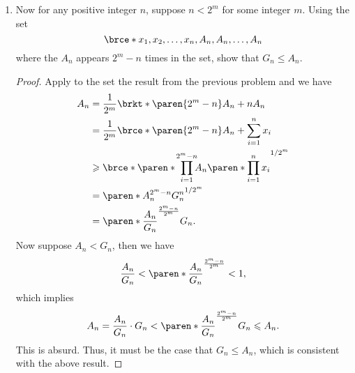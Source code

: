\documentclass[a4paper]{article}
\begin{document}
\begin{enumerate}
\begin{enumerate}
  \item Now for any positive integer \(n\), suppose \(n < 2^m\) for some
    integer \(m\).  Using the set
    \[
      \brce*{x_1, x_2, \dotsc , x_n, A_n, A_n, \dotsc, A_n}
    \]
    where the \(A_n\) appears \(2^m − n\) times in the set, show that
    \(G_n \le A_n\).

    \begin{proof}
      Apply to the set the result from the previous problem and we have
      \begin{align*}
        A_n &= \frac{1}{2^m} \brkt*{\paren{2^m - n}A_n + n A_n} \\
            &= \frac{1}{2^m} \brce*{\paren{2^m - n}A_n + \sum_{i=1}^n x_i} \\
            &\ge \brce*{\paren*{\mspace{6mu} \prod_{i=1}^{\mathclap{2^m-n}} A_n}  \paren*{\prod_{i=1}^{n} x_i}}^{1/2^m} \\
            &= \paren*{A_n^{2^m-n} G_n^n}^{1/2^m} \\
            &= \paren*{\frac{A_n}{G_n}}^{\frac{2^m-n}{2^m}} G_n.
      \end{align*}
      Now suppose \(A_n < G_n\), then we have
      \begin{displaymath}
        \frac{A_n}{G_n} < \paren*{\frac{A_n}{G_n}}^{\frac{2^m-n}{2^m}} < 1,
      \end{displaymath}
      which implies
      \begin{displaymath}
        A_n = \frac{A_n}{G_n} \cdot G_n < \paren*{\frac{A_n}{G_n}}^{\frac{2^m-n}{2^m}} G_n \le A_n.
      \end{displaymath}
      This is absurd.  Thus, it must be the case that \(G_n \le A_n\), which
      is consistent with the above result.
    \end{proof}
  \end{enumerate}
\end{enumerate}
\end{document}
